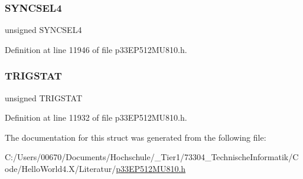 \mbox{\label{structtag_o_c12_c_o_n2_b_i_t_s_a0cd5bbe196c7974953909d27a6307bb7}} 
\subsubsection{\texorpdfstring{S\+Y\+N\+C\+S\+E\+L4}{SYNCSEL4}}
{\footnotesize\ttfamily unsigned S\+Y\+N\+C\+S\+E\+L4}



Definition at line 11946 of file p33\+E\+P512\+M\+U810.\+h.

\mbox{\label{structtag_o_c12_c_o_n2_b_i_t_s_ab379549de54ac93ad4aa73686c34cb7c}} 
\subsubsection{\texorpdfstring{T\+R\+I\+G\+S\+T\+AT}{TRIGSTAT}}
{\footnotesize\ttfamily unsigned T\+R\+I\+G\+S\+T\+AT}



Definition at line 11932 of file p33\+E\+P512\+M\+U810.\+h.



The documentation for this struct was generated from the following file\+:\begin{DoxyCompactItemize}
\item 
C\+:/\+Users/00670/\+Documents/\+Hochschule/\+\_\+\+Tier1/73304\+\_\+\+Technische\+Informatik/\+Code/\+Hello\+World4.\+X/\+Literatur/\hyperlink{p33_e_p512_m_u810_8h}{p33\+E\+P512\+M\+U810.\+h}\end{DoxyCompactItemize}
